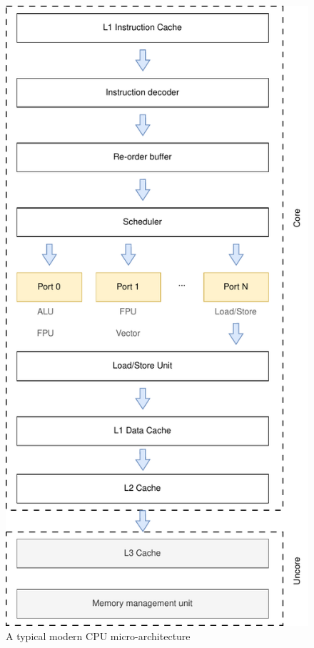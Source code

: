 \begin{figure}[h!]
  \centering
  \caption{A typical modern CPU micro-architecture}
  \includegraphics[scale=0.5]{cpu_uarch.pdf}
\end{figure}

